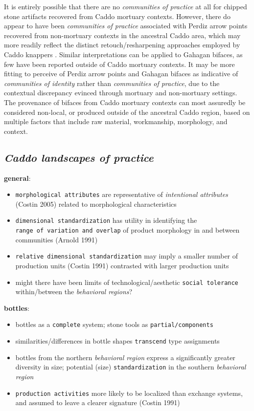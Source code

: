 \documentclass[smallextended]{svjour3}       %
\begin{document}
It is entirely possible that there are no \emph{communities of practice}
at all for chipped stone artifacts recovered from Caddo mortuary
contexts. However, there do appear to have been \emph{communities of
practice} associated with Perdiz arrow points recovered from
non-mortuary contexts in the ancestral Caddo area, which may more
readily reflect the distinct retouch/resharpening approaches employed by
Caddo knappers \cite{RN9364}. Similar interpretations can be applied to
Gahagan bifaces, as few have been reported outside of Caddo mortuary
contexts. It may be more fitting to perceive of Perdiz arrow points and
Gahagan bifaces as indicative of \emph{communities of identity} rather
than \emph{communities of practice}, due to the contextual discrepancy
evinced through mortuary and non-mortuary settings. The provenance of
bifaces from Caddo mortuary contexts can most assuredly be considered
non-local, or produced outside of the ancestral Caddo region, based on
multiple factors that include raw material, workmanship, morphology, and
context.

\hypertarget{caddo-landscapes-of-practice}{%
\subsection{\texorpdfstring{\emph{Caddo landscapes of
practice}}{Caddo landscapes of practice}}\label{caddo-landscapes-of-practice}}

\textbf{general}:

\begin{itemize}
\item
  \texttt{morphological\ attributes} are representative of
  \emph{intentional attributes} (Costin 2005) related to morphological
  characteristics
\item
  \texttt{dimensional\ standardization} has utility in identifying the
  \texttt{range\ of\ variation\ and\ overlap} of product morphology in
  and between communities (Arnold 1991)
\item
  \texttt{relative\ dimensional\ standardization} may imply a smaller
  number of production units (Costin 1991) contrasted with larger
  production units
\item
  might there have been limits of technological/aesthetic
  \texttt{social\ tolerance} within/between the \emph{behavioral
  regions}?
\end{itemize}

\textbf{bottles}:

\begin{itemize}
\item
  bottles as a \texttt{complete} system; stone tools as
  \texttt{partial/components}
\item
  similarities/differences in bottle shapes \texttt{transcend} type
  assignments
\item
  bottles from the northern \emph{behavioral region} express a
  significantly greater diversity in size; potential (size)
  \texttt{standardization} in the southern \emph{behavioral region}
\item
  \texttt{production\ activities} more likely to be localized than
  exchange systems, and assumed to leave a clearer signature (Costin
  1991)
\end{itemize}
\end{document}
